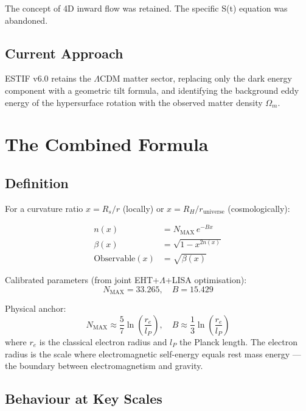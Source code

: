 \documentclass[12pt]{article}
\begin{document}
The concept of 4D inward flow was retained. The specific S(t) equation was abandoned.

\subsection{Current Approach}

ESTIF v6.0 retains the $\Lambda$CDM matter sector, replacing only the dark energy
component with a geometric tilt formula, and identifying the background eddy energy
of the hypersurface rotation with the observed matter density $\Omega_m$.

\section{The Combined Formula}

\subsection{Definition}

For a curvature ratio $x = R_s/r$ (locally) or $x = R_H/r_\text{universe}$ (cosmologically):

\begin{align}
n(x) &= N_\text{MAX}\, e^{-Bx} \label{eq:n} \\
\beta(x) &= \sqrt{1 - x^{2n(x)}} \label{eq:beta} \\
\text{Observable}(x) &= \sqrt{\beta(x)} \label{eq:obs}
\end{align}

Calibrated parameters (from joint EHT+$\Lambda$+LISA optimisation):
\begin{equation}
N_\text{MAX} = 33.265, \quad B = 15.429
\end{equation}

Physical anchor:
\begin{equation}
N_\text{MAX} \approx \frac{5}{7}\ln\!\left(\frac{r_e}{l_P}\right), \quad
B \approx \frac{1}{3}\ln\!\left(\frac{r_e}{l_P}\right)
\end{equation}
where $r_e$ is the classical electron radius and $l_P$ the Planck length.
The electron radius is the scale where electromagnetic self-energy equals
rest mass energy --- the boundary between electromagnetism and gravity.

\subsection{Behaviour at Key Scales}
\end{document}
